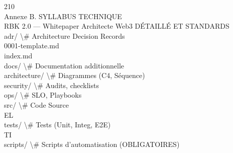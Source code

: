 \documentclass[12pt,landscape,a4paper]{article}
\begin{document}
\vspace{0.5em}
\vspace{0.5em}
\vspace{0.5em}
\vspace{0.5em}
210\\
Annexe B. SYLLABUS TECHNIQUE\\
RBK 2.0 — Whitepaper Architecte Web3                                                                       DÉTAILLÉ ET STANDARDS\\
\vspace{0.5em}
\vspace{0.5em}
\vspace{0.5em}
adr/                        \textbackslash{}# Architecture Decision Records\\
0001-template.md\\
index.md\\
\vspace{0.5em}
\vspace{0.5em}
docs/                       \textbackslash{}# Documentation additionnelle\\
architecture/             \textbackslash{}# Diagrammes (C4, Séquence)\\
security/                 \textbackslash{}# Audits, checklists\\
ops/                      \textbackslash{}# SLO, Playbooks\\
\vspace{0.5em}
\vspace{0.5em}
src/                        \textbackslash{}# Code Source\\
\vspace{0.5em}
\vspace{0.5em}
\vspace{0.5em}
\vspace{0.5em}
EL\\
tests/                      \textbackslash{}# Tests (Unit, Integ, E2E)\\
\vspace{0.5em}
\vspace{0.5em}
\vspace{0.5em}
\vspace{0.5em}
TI\\
scripts/                    \textbackslash{}# Scripts d'automatisation (OBLIGATOIRES)\\
\vspace{0.5em}
\vspace{0.5em}
\vspace{0.5em}
\vspace{0.5em}
\end{document}
